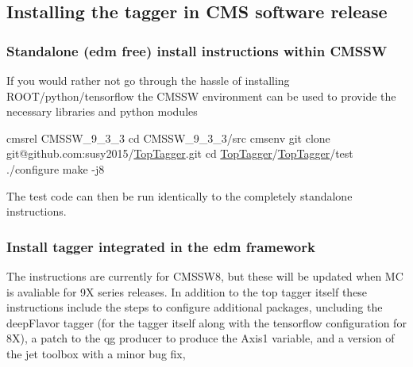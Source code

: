 \subsection*{Installing the tagger in C\-M\-S software release}

\subsubsection*{Standalone (edm free) install instructions within C\-M\-S\-S\-W}

If you would rather not go through the hassle of installing R\-O\-O\-T/python/tensorflow the C\-M\-S\-S\-W environment can be used to provide the necessary libraries and python modules


\begin{DoxyCode}
cmsrel CMSSW\_9\_3\_3
cd CMSSW\_9\_3\_3/src
cmsenv
git clone git@github.com:susy2015/\hyperlink{classTopTagger}{TopTagger}.git
cd \hyperlink{classTopTagger}{TopTagger}/\hyperlink{classTopTagger}{TopTagger}/test
./configure
make -j8 
\end{DoxyCode}


The test code can then be run identically to the completely standalone instructions.

\subsubsection*{Install tagger integrated in the edm framework}

The instructions are currently for C\-M\-S\-S\-W8, but these will be updated when M\-C is avaliable for 9\-X series releases. In addition to the top tagger itself these instructions include the steps to configure additional packages, uncluding the deep\-Flavor tagger (for the tagger itself along with the tensorflow configuration for 8\-X), a patch to the qg producer to produce the Axis1 variable, and a version of the jet toolbox with a minor bug fix,


